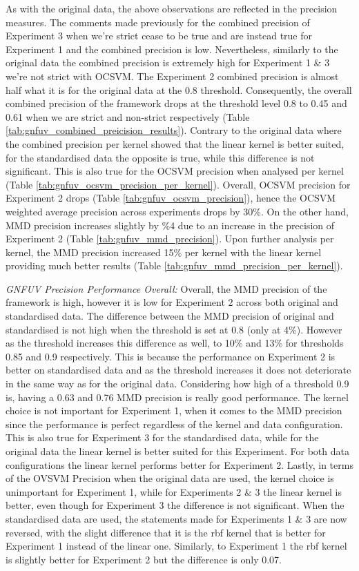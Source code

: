 \documentclass{mpaper}
\begin{document}
As with the original data, the above observations are reflected in the precision measures. The comments made previously for the combined precision of Experiment 3 when we're strict cease to be true and are instead true for Experiment 1 and the combined precision is low. Nevertheless, similarly to the original data the combined precision is extremely high for Experiment 1 \& 3 we're not strict with OCSVM. The Experiment 2 combined precision is almost half what it is for the original data at the 0.8 threshold. Consequently, the overall combined precision of the framework drops at the threshold level 0.8 to 0.45 and 0.61 when we are strict and non-strict respectively (Table \ref{tab:gnfuv_combined_preicision_results}). Contrary to the original data where the combined precision per kernel showed that the linear kernel is better suited, for the standardised data the opposite is true, while this difference is not significant. This is also true for the OCSVM precision when analysed per kernel (Table \ref{tab:gnfuv_ocsvm_precision_per_kernel}).  Overall, OCSVM precision for Experiment 2 drops (Table \ref{tab:gnfuv_ocsvm_precision}), hence the OCSVM weighted average precision across experiments drops by 30\%. On the other hand, MMD precision increases slightly by \%4 due to an increase in the precision of Experiment 2 (Table \ref{tab:gnfuv_mmd_precision}). Upon further analysis per kernel, the MMD precision increased 15\% per kernel with the linear kernel providing much better results (Table \ref{tab:gnfuv_mmd_precision_per_kernel}).

\textit{GNFUV Precision Performance Overall:} {} Overall, the MMD precision of the framework is high, however it is low for Experiment 2 across both original and standardised data. The difference between the MMD precision of original and standardised is not high when the threshold is set at 0.8 (only at 4\%). However as the threshold increases this difference as well, to 10\% and 13\% for thresholds 0.85 and 0.9 respectively. This is because the performance on Experiment 2 is better on standardised data and as the threshold increases it does not deteriorate in the same way as for the original data. Considering how high of a threshold 0.9 is, having a 0.63 and 0.76 MMD precision is really good performance. The kernel choice is not important for Experiment 1, when it comes to the MMD precision since the performance is perfect regardless of the kernel and data configuration. This is also true for Experiment 3 for the standardised data, while for the original data the linear kernel is better suited for this Experiment. For both data configurations the linear kernel performs better for Experiment 2. Lastly, in terms of the OVSVM Precision when the original data are used, the kernel choice is unimportant for Experiment 1, while for Experiments 2 \& 3 the linear kernel is better, even though for Experiment 3 the difference is not significant. When the standardised data are used, the statements made for Experiments 1 \& 3 are now reversed, with the slight difference that it is the rbf kernel that is better for Experiment 1 instead of the linear one. Similarly, to Experiment 1 the rbf kernel is slightly better for Experiment 2 but the difference is only 0.07.
\end{document}

